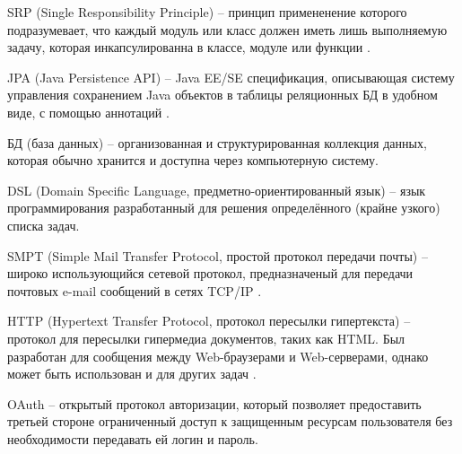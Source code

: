 \hypertarget{gloss:srp}{
    SRP (Single Responsibility Principle) – принцип примененение которого подразумевает, что каждый модуль или класс должен иметь лишь выполняемую задачу, 
    которая инкапсулированна в классе, модуле или функции \cite{srp}.
}

\hypertarget{gloss:jpa}{
    JPA (Java Persistence API) – Java EE/SE спецификация, описывающая систему управления сохранением Java объектов в таблицы реляционных БД в удобном виде, с помощью аннотаций \cite{jpa}.
}

\hypertarget{gloss:db}{
    БД (база данных) – организованная и структурированная коллекция данных, которая обычно хранится и доступна через компьютерную систему.
}

\hypertarget{gloss:dsl}{
    DSL (Domain Specific Language, предметно-ориентированный язык) – язык программирования разработанный для решения определённого (крайне узкого) списка задач. 
}

\hypertarget{gloss:smtp}{
    SMPT (Simple Mail Transfer Protocol, простой протокол передачи почты) – широко использующийся сетевой протокол, предназначеный для передачи почтовых e-mail сообщений в сетях TCP/IP \cite{smpt}. 
}

\hypertarget{gloss:http}{
    HTTP (Hypertext Transfer Protocol, протокол пересылки гипертекста) – протокол для пересылки гипермедиа документов, таких как HTML.
    Был разработан для сообщения между Web-браузерами и Web-серверами, однако может быть использован и для других задач \cite{http}.
}

\hypertarget{gloss:oauth}{
    OAuth – открытый протокол авторизации, который позволяет предоставить третьей стороне ограниченный доступ к защищенным ресурсам пользователя без необходимости передавать ей логин и пароль.
}

\clearpage